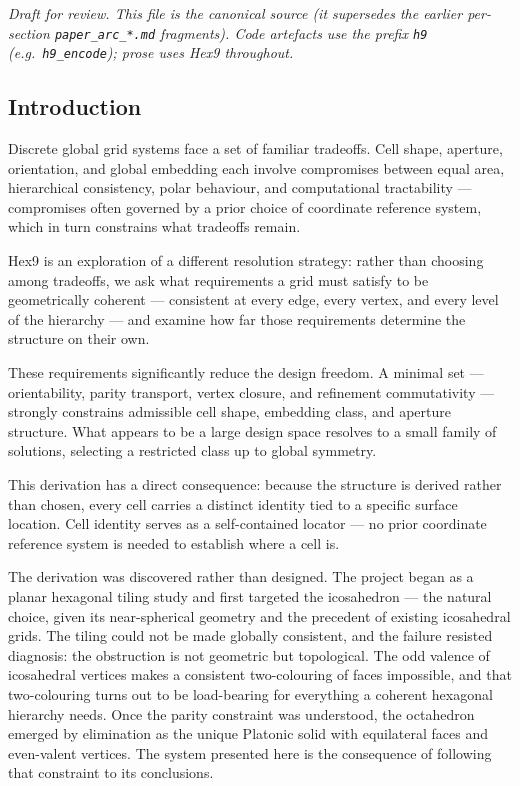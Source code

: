 \documentclass[
  11pt,
  a4paper,
]{article}
\begin{document}
{
\setcounter{tocdepth}{2}
\tableofcontents
}
\emph{Draft for review. This file is the canonical source (it supersedes
the earlier per-section \texttt{paper\_arc\_*.md} fragments). Code
artefacts use the prefix \texttt{h9} (e.g.~\texttt{h9\_encode}); prose
uses Hex9 throughout.}

\subsection{Introduction}\label{introduction}

Discrete global grid systems face a set of familiar tradeoffs. Cell
shape, aperture, orientation, and global embedding each involve
compromises between equal area, hierarchical consistency, polar
behaviour, and computational tractability --- compromises often governed
by a prior choice of coordinate reference system, which in turn
constrains what tradeoffs remain.

Hex9 is an exploration of a different resolution strategy: rather than
choosing among tradeoffs, we ask what requirements a grid must satisfy
to be geometrically coherent --- consistent at every edge, every vertex,
and every level of the hierarchy --- and examine how far those
requirements determine the structure on their own.

These requirements significantly reduce the design freedom. A minimal
set --- orientability, parity transport, vertex closure, and refinement
commutativity --- strongly constrains admissible cell shape, embedding
class, and aperture structure. What appears to be a large design space
resolves to a small family of solutions, selecting a restricted class up
to global symmetry.

This derivation has a direct consequence: because the structure is
derived rather than chosen, every cell carries a distinct identity tied
to a specific surface location. Cell identity serves as a self-contained
locator --- no prior coordinate reference system is needed to establish
where a cell is.

The derivation was discovered rather than designed. The project began as
a planar hexagonal tiling study and first targeted the icosahedron ---
the natural choice, given its near-spherical geometry and the precedent
of existing icosahedral grids. The tiling could not be made globally
consistent, and the failure resisted diagnosis: the obstruction is not
geometric but topological. The odd valence of icosahedral vertices makes
a consistent two-colouring of faces impossible, and that two-colouring
turns out to be load-bearing for everything a coherent hexagonal
hierarchy needs. Once the parity constraint was understood, the
octahedron emerged by elimination as the unique Platonic solid with
equilateral faces and even-valent vertices. The system presented here is
the consequence of following that constraint to its conclusions.
\end{document}
